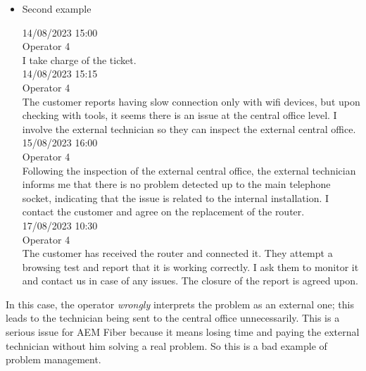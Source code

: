 \begin{itemize}
      \item Second example

            14/08/2023 15:00\\
            Operator 4\\
            I take charge of the ticket.\\

            14/08/2023 15:15\\
            Operator 4\\
            The customer reports having slow connection only with wifi devices, but upon checking with tools, it seems there is an issue at the central office level. I involve the external technician so they can inspect the external central office.\\

            15/08/2023 16:00\\
            Operator 4\\
            Following the inspection of the external central office, the external technician informs me that there is no problem detected up to the main telephone socket, indicating that the issue is related to the internal installation. I contact the customer and agree on the replacement of the router.\\

            17/08/2023 10:30\\
            Operator 4\\
            The customer has received the router and connected it. They attempt a browsing test and report that it is working correctly. I ask them to monitor it and contact us in case of any issues. The closure of the report is agreed upon.
\end{itemize}

In this case, the operator \textit{wrongly} interprets the problem as an external one; this leads to the technician being sent to the central office unnecessarily. This is a serious issue for AEM Fiber because it means losing time and paying the external technician without him solving a real problem. So this is a bad example of problem management.